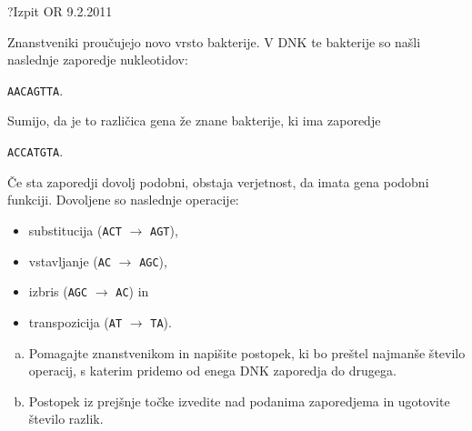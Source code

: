 \begin{naloga}{?}{Izpit OR 9.2.2011}
\begin{vprasanje}
Znanstveniki proučujejo novo vrsto bakterije.
V DNK te bakterije so našli na\-sled\-nje zaporedje nukleotidov:
\begin{center}
{\tt AACAGTTA}.
\end{center}
Sumijo, da je to različica gena že znane bakterije, ki ima zaporedje
\begin{center}
{\tt ACCATGTA}.
\end{center}
Če sta zaporedji dovolj podobni,
obstaja verjetnost, da imata gena podobni funkciji.
Dovoljene so naslednje operacije:
\begin{itemize}
\item substitucija ({\tt ACT} $\to$ {\tt AGT}),
\item vstavljanje ({\tt AC} $\to$ {\tt AGC}),
\item izbris ({\tt AGC} $\to$ {\tt AC}) in
\item transpozicija ({\tt AT} $\to$ {\tt TA}).
\end{itemize}
\begin{enumerate}[(a)]
\item Pomagajte znanstvenikom in napišite postopek,
ki bo preštel najmanše število operacij,
s katerim pridemo od enega DNK zaporedja do drugega.
\item Postopek iz prejšnje točke izvedite nad podanima zaporedjema
in ugotovite število razlik.
\end{enumerate}
\end{vprasanje}
\begin{odgovor}
\end{odgovor}
\end{naloga}
